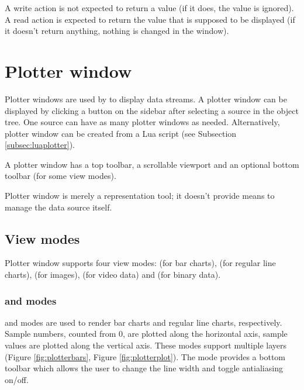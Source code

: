 \documentclass[a4paper,12pt,twoside,extrafontsizes]{memoir}
\begin{document}
A write action is not expected to return a value (if it does, the value is ignored). A read action is expected to return the value that is supposed to be displayed (if it doesn't return anything, nothing is changed in the window).

\chapter{Plotter window}
\label{ch:plotter}

Plotter windows are used by  to display data streams. A plotter window can be displayed by clicking a  button on the sidebar after selecting a source in the object tree. One source can have as many plotter windows as needed. Alternatively, plotter window can be created from a Lua script (see Subsection \ref{subsec:luaplotter}).

A plotter window has a top toolbar, a scrollable viewport and an optional bottom toolbar (for some view modes).

Plotter window is merely a representation tool; it doesn't provide means to manage the data source itself.

\section{View modes}

Plotter window supports four view modes:  (for bar charts),  (for regular line charts),  (for images),  (for video data) and  (for binary data).

\subsection{ and  modes}

 and  modes are used to render bar charts and regular line charts, respectively. Sample numbers, counted from 0, are plotted along the horizontal axis, sample values are plotted along the vertical axis. These modes support multiple layers (Figure \ref{fig:plotterbars}, Figure \ref{fig:plotterplot}). The  mode provides a bottom toolbar which allows the user to change the line width and toggle antialiasing on/off.
\end{document}

